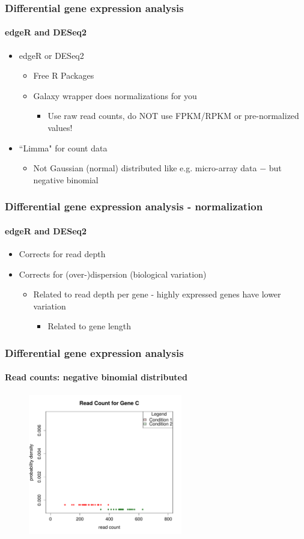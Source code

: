 \documentclass{beamer}			  %
\begin{document}
\begin{frame}
	\frametitle{Differential gene expression analysis}
	\framesubtitle{edgeR and DESeq2}
	\begin{itemize}
			\item edgeR or DESeq2\cite{edger,deseq2}
		\begin{itemize}
			\item Free R Packages
		\item Galaxy wrapper does normalizations for you
		\begin{itemize}
			\item Use raw read counts, do NOT use FPKM/RPKM or pre-normalized values!
		\end{itemize}
	\end{itemize}
		\item ``Limma" for count data
		\begin{itemize}
			\item Not Gaussian (normal) distributed like e.g. micro-array data $-$ but negative binomial 
		\end{itemize}
	\end{itemize}
\end{frame}

\begin{frame}
	\frametitle{Differential gene expression analysis - normalization}
	\framesubtitle{edgeR and DESeq2}
	\begin{itemize}
		\item Corrects for read depth
		\item Corrects for (over-)dispersion (biological variation)
		\begin{itemize}
			\item Related to read depth per gene - highly expressed genes have lower variation
			\begin{itemize}
				\item Related to gene length
			\end{itemize}
		\end{itemize}
	\end{itemize}
\end{frame}

\begin{frame}
\frametitle{Differential gene expression analysis}
\framesubtitle{Read counts: negative binomial distributed}
	\begin{figure}
		\includegraphics[width=0.60\textwidth]{figures/dge_10ap.pdf}
	\end{figure}
\end{frame}
\end{document}
